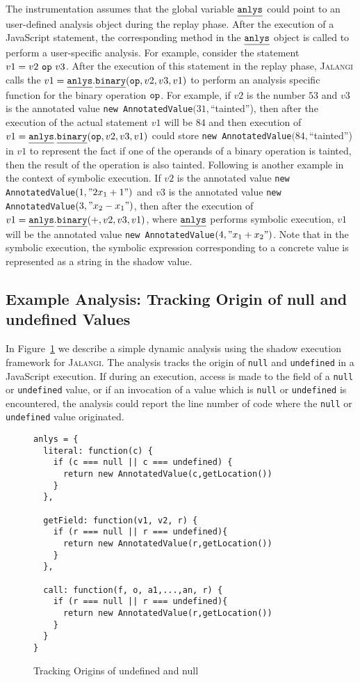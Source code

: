 \documentclass{sig-alternate}
\def\jalangi{\textsc{Jalangi}}
\newcommand \dsl [1] {\ensuremath{{\tt #1}}\xspace}
\newcommand \usl [1] {\mbox{\underline{\tt #1}}\xspace}
\newcommand \analysis{\usl{anlys}}
\begin{document}
The instrumentation assumes that the global variable $\analysis$ could
point to an user-defined analysis object during the replay phase.
After the execution of a JavaScript statement, the corresponding
method in the $\analysis$ object is called to perform a user-specific
analysis.  For example, consider the statement $v1 = v2\ \dsl{op}\
v3$.  After the execution of this statement in the replay phase,
\jalangi{} calls the $v1 = \analysis.\usl{binary}(\dsl{op}, v2, v3,
v1)$ to perform an analysis specific function for the binary operation
$\dsl{op}$.  For example, if $v2$ is the number $53$ and $v3$ is the
annotated value \texttt{new AnnotatedValue}$(31,$``tainted''), then
after the execution of the actual statement $v1$ will be $84$ and then
execution of $v1 = \analysis.\usl{binary}(\dsl{op}, v2, v3, v1)$ could
store \texttt{new AnnotatedValue}$(84,$``tainted'') in $v1$ to
represent the fact if one of the operands of a binary operation is
tainted, then the result of the operation is also tainted.  Following
is another example in the context of symbolic execution.  If $v2$ is
the annotated value \texttt{new AnnotatedValue}$(1, "2x_1+1")$ and
$v3$ is the annotated value \texttt{new AnnotatedValue}$(3,
"x_2-x_1")$, then after the execution of $v1 =
\analysis.\usl{binary}(+, v2, v3, v1)$, where $\analysis$ performs
symbolic execution, $v1$ will be the annotated value \texttt{new
  AnnotatedValue}$(4, "x_1+x_2")$.  Note that in the symbolic
execution, the symbolic expression corresponding to a concrete value
is represented as a string in the shadow value.

\subsection{Example Analysis: Tracking Origin of null and undefined Values}
\label{sec:example-analysis}

In Figure~\ref{fig:lib3} we describe a simple dynamic analysis using
the shadow execution framework for \jalangi{}.  The analysis tracks
the origin of \texttt{null} and \texttt{undefined} in a JavaScript
execution.  If during an execution, access is made to the field of a
\texttt{null} or \texttt{undefined} value, or if an invocation of a
value which is \texttt{null} or \texttt{undefined} is encountered, the
analysis could report the line number of code where the \texttt{null}
or \texttt{undefined} value originated.

\begin{figure}
 {\scriptsize
\begin{lstlisting}
anlys = {
  literal: function(c) {
    if (c === null || c === undefined) {
      return new AnnotatedValue(c,getLocation())
    }
  },

  getField: function(v1, v2, r) {
    if (r === null || r === undefined){
      return new AnnotatedValue(r,getLocation())
    }
  },

  call: function(f, o, a1,...,an, r) {
    if (r === null || r === undefined){
      return new AnnotatedValue(r,getLocation())
    }
  }
}
\end{lstlisting}
}
  \caption{Tracking Origins of undefined and null}
  \label{fig:lib3}
\end{figure}
\end{document}
